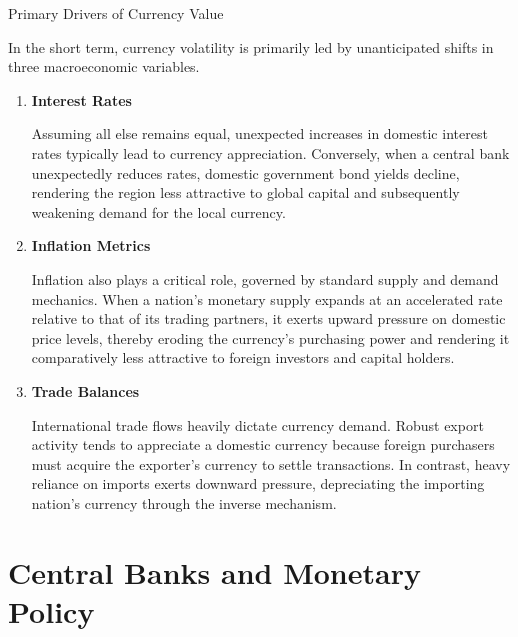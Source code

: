 \documentclass[10pt]{article}
\begin{document}
  \begin{core}{Primary Drivers of Currency Value}

    In the short term, currency volatility is primarily led by unanticipated shifts in three macroeconomic variables.

    \begin{enumerate}

      \item \textbf{Interest Rates} 

      Assuming all else remains equal, unexpected increases in domestic interest rates typically lead to currency appreciation. Conversely, when a central bank unexpectedly reduces rates, domestic government bond yields decline, rendering the region less attractive to global capital and subsequently weakening demand for the local currency. 

      \item \textbf{Inflation Metrics}

      Inflation also plays a critical role, governed by standard supply and demand mechanics. When a nation's monetary supply expands at an accelerated rate relative to that of its trading partners, it exerts upward pressure on domestic price levels, thereby eroding the currency's purchasing power and rendering it comparatively less attractive to foreign investors and capital holders.

      \item \textbf{Trade Balances}

      International trade flows heavily dictate currency demand. Robust export activity tends to appreciate a domestic currency because foreign purchasers must acquire the exporter's currency to settle transactions. In contrast, heavy reliance on imports exerts downward pressure, depreciating the importing nation's currency through the inverse mechanism.

    \end{enumerate}

  \end{core}

\section{Central Banks and Monetary Policy}
\end{document}

